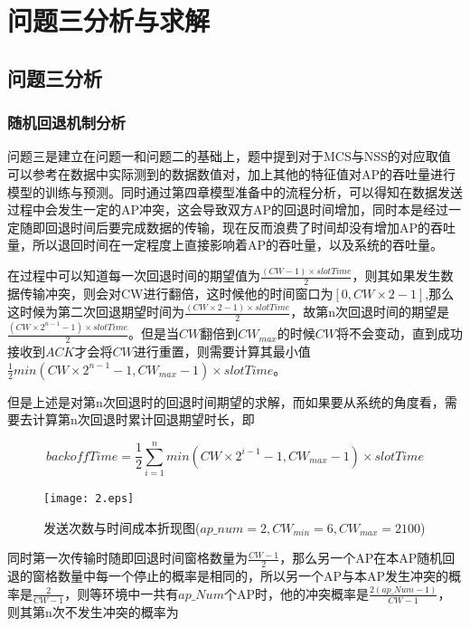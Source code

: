 \section{问题三分析与求解}
\subsection{问题三分析}
\subsubsection{随机回退机制分析}

问题三是建立在问题一和问题二的基础上，题中提到对于MCS与NSS的对应取值可以参考在数据中实际测到的数据数值对，加上其他的特征值对AP的吞吐量进行模型的训练与预测。同时通过第四章模型准备中的流程分析，可以得知在数据发送过程中会发生一定的AP冲突，这会导致双方AP的回退时间增加，同时本是经过一定随即回退时间后要完成数据的传输，现在反而浪费了时间却没有增加AP的吞吐量，所以退回时间在一定程度上直接影响着AP的吞吐量，以及系统的吞吐量。

在过程中可以知道每一次回退时间的期望值为$\frac{(CW-1)\times slotTime}{2}$，则其如果发生数据传输冲突，则会对CW进行翻倍，这时候他的时间窗口为$\left[ 0,CW\times 2-1\right] $,那么这时候为第二次回退期望时间为$\frac{(CW\times 2-1)\times slotTime}{2}$，故第n次回退时间的期望是$\frac{(CW\times 2^{n-1}-1)\times slotTime}{2}$。但是当$CW$翻倍到$CW_{max}$的时候$CW$将不会变动，直到成功接收到$ACK$才会将$CW$进行重置，则需要计算其最小值$\frac{1}{2}min(CW\times 2^{n-1}-1,CW_{max}-1)\times slotTime$。

但是上述是对第n次回退时的回退时间期望的求解，而如果要从系统的角度看，需要去计算第n次回退时累计回退期望时长，即

\begin{equation}\label{eq1}
	backoffTime=\frac{1}{2}\sum_{i=1}^{n} min(CW\times 2^{i-1}-1,CW_{max}-1)\times slotTime
\end{equation}


\begin{figure}[htbp]
	\centering
	\texttt{[image: 2.eps]}
	\caption{发送次数与时间成本折现图($ap\_num=2,CW_{min}=6,CW_{max}=2100$)}
	\label{figure2}
\end{figure}

同时第一次传输时随即回退时间窗格数量为$\frac{CW-1}{2}$，那么另一个AP在本AP随机回退的窗格数量中每一个停止的概率是相同的，所以另一个AP与本AP发生冲突的概率是$\frac{2}{CW-1}$，则等环境中一共有$ap\_Num$个AP时，他的冲突概率是$\frac{2(ap\_Num-1)}{CW-1}$，则其第n次不发生冲突的概率为


